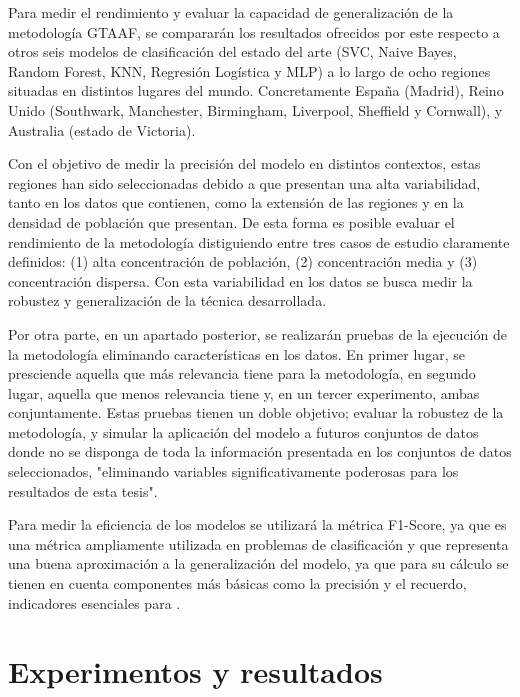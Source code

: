 \documentclass{uathesis-es}
\begin{document}
{	Para medir el rendimiento y evaluar la capacidad de generalización de la metodología GTAAF, se compararán los resultados ofrecidos por este respecto a otros seis modelos de clasificación del estado del arte (SVC, Naive Bayes, Random Forest, KNN, Regresión Logística y MLP) a lo largo de ocho regiones situadas en distintos lugares del mundo. Concretamente España (Madrid), Reino Unido (Southwark, Manchester, Birmingham, Liverpool, Sheffield y Cornwall), y Australia (estado de Victoria).
	
	Con el objetivo de medir la precisión del modelo en distintos contextos, estas regiones han sido seleccionadas debido a que presentan una alta variabilidad, tanto en los datos que contienen, como la extensión de las regiones y en la densidad de población que presentan. De esta forma es posible evaluar el rendimiento de la metodología distiguiendo entre tres casos de estudio claramente definidos: (1) alta concentración de población, (2) concentración media y (3) concentración dispersa. Con esta variabilidad en los datos se busca medir la robustez y generalización de la técnica desarrollada.
	
	Por otra parte, en un apartado posterior, se realizarán pruebas de la ejecución de la metodología eliminando características en los datos. En primer lugar, se presciende aquella que más relevancia tiene para la metodología, en segundo lugar, aquella que menos relevancia tiene y, en un tercer experimento, ambas conjuntamente. Estas pruebas tienen un doble objetivo; evaluar la robustez de la metodología, y simular la aplicación del modelo a futuros conjuntos de datos donde no se disponga de toda la información presentada en los conjuntos de datos seleccionados, "eliminando variables significativamente poderosas para los resultados de esta tesis".
	
	Para medir la eficiencia de los modelos se utilizará la métrica F1-Score, ya que es una métrica ampliamente utilizada en problemas de clasificación y que representa una buena aproximación a la generalización del modelo, ya que para su cálculo se tienen en cuenta componentes más básicas como la precisión y el recuerdo, indicadores esenciales para .
	

	\chapter{Experimentos y resultados}
	
}
\end{document}
